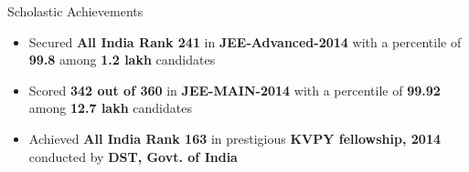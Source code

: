 \documentclass{resume}
\newcommand{\sepval}{-0.5em}
\begin{document}

\renewcommand\labelitemi{\raisebox{0.45ex}{\tiny$\bullet$}}

\begin{rSection}{Scholastic Achievements}

\begin{itemize}[leftmargin=*]
	
	\itemsep \sepval

	\item Secured {\bf All India Rank 241} in {\bf JEE-Advanced-2014} with a percentile of {\bf 99.8} among {\bf 1.2 lakh} candidates
	
	\item Scored {\bf 342 out of 360} in {\bf JEE-MAIN-2014} with a percentile of {\bf 99.92} among {\bf 12.7 lakh} candidates

	\item  Achieved {\bf All India Rank 163} in prestigious {\bf KVPY fellowship, 2014} conducted by {\bf DST, Govt. of India}

	
\end{itemize}

\end{rSection}

\end{document}
